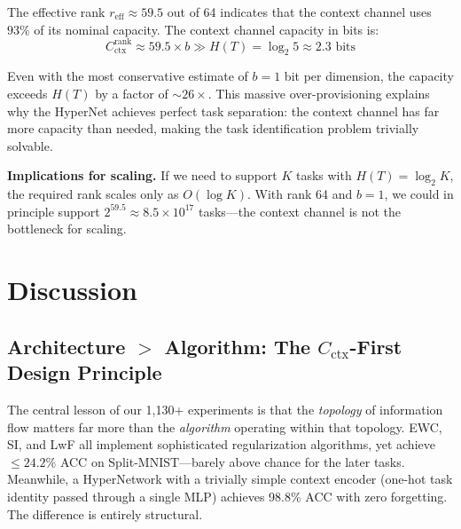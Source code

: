 \documentclass{article}
\begin{document}
The effective rank $r_\mathrm{eff} \approx 59.5$ out of 64 indicates that the context channel uses $93\%$ of its nominal capacity. The context channel capacity in bits is:
\begin{equation}
    C_\mathrm{ctx}^\mathrm{rank} \approx 59.5 \times b \gg H(T) = \log_2 5 \approx 2.3 \text{ bits}
\end{equation}

Even with the most conservative estimate of $b = 1$ bit per dimension, the capacity exceeds $H(T)$ by a factor of $\sim 26\times$. This massive over-provisioning explains why the HyperNet achieves perfect task separation: the context channel has far more capacity than needed, making the task identification problem trivially solvable.

\textbf{Implications for scaling.} If we need to support $K$ tasks with $H(T) = \log_2 K$, the required rank scales only as $O(\log K)$. With rank 64 and $b = 1$, we could in principle support $2^{59.5} \approx 8.5 \times 10^{17}$ tasks---the context channel is not the bottleneck for scaling.



\section{Discussion}
\label{sec:discussion}

\subsection{Architecture $>$ Algorithm: The $C_\mathrm{ctx}$-First Design Principle}
\label{sec:design_principle}

The central lesson of our 1,130+ experiments is that the \emph{topology} of information flow matters far more than the \emph{algorithm} operating within that topology. EWC, SI, and LwF all implement sophisticated regularization algorithms, yet achieve $\leq 24.2\%$ ACC on Split-MNIST---barely above chance for the later tasks. Meanwhile, a HyperNetwork with a trivially simple context encoder (one-hot task identity passed through a single MLP) achieves 98.8\% ACC with zero forgetting. The difference is entirely structural.
\end{document}
